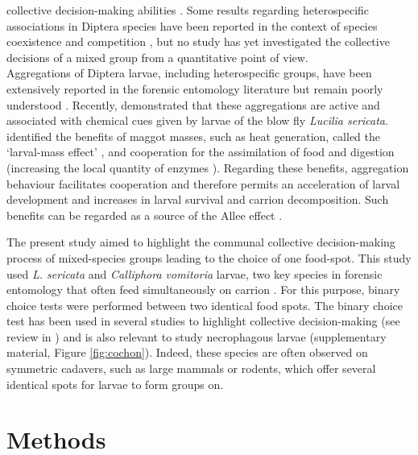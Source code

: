 collective decision-making abilities \cite{farine_collective_2014}. Some results regarding heterospecific associations in Diptera species have been reported in the context of species coexistence and competition \cite{dos_reis_larval_1999}, but no study has yet investigated the collective decisions of a mixed group from a quantitative point of view.\\
Aggregations of Diptera larvae, including heterospecific groups, have been extensively reported in the forensic entomology literature but remain poorly understood \citep{rivers_physiological_2011,charabidze_larval-mass_2011,boulay_evidence_2013,heaton_quantifying_2014}. Recently, \citet{boulay_evidence_2013} demonstrated that these aggregations are active and associated with chemical cues given by larvae of the blow fly \textit{Lucilia sericata}. \citet{rivers_physiological_2011} identified the benefits of maggot masses, such as heat generation, called the ‘larval-mass effect’ \cite{charabidze_larval-mass_2011}, and cooperation for the assimilation of food and digestion (increasing the local quantity of enzymes \cite{wilson_impacts_2015}). Regarding these benefits, aggregation behaviour facilitates cooperation and therefore permits an acceleration of larval development and increases in larval survival and carrion decomposition. Such benefits can be regarded as a source of the Allee effect \citep{courchamp_allee_2008,wilson_impacts_2015}.

The present study aimed to highlight the communal collective decision-making process of mixed-species groups leading to the choice of one food-spot. This study used \textit{L. sericata} and \textit{Calliphora vomitoria} larvae, two key species in forensic entomology that often feed simultaneously on carrion \cite{amendt_forensic_2004}. For this purpose, binary choice tests were performed between two identical food spots. The binary choice test has been used in several studies to highlight collective decision-making (see review in \citet{jeanson_key_2012}) and is also relevant to study necrophagous larvae (supplementary material, Figure \ref{fig:cochon}). Indeed, these species are often observed on symmetric cadavers, such as large mammals or rodents, which offer several identical spots for larvae to form groups on.
    
	\section{Methods}
